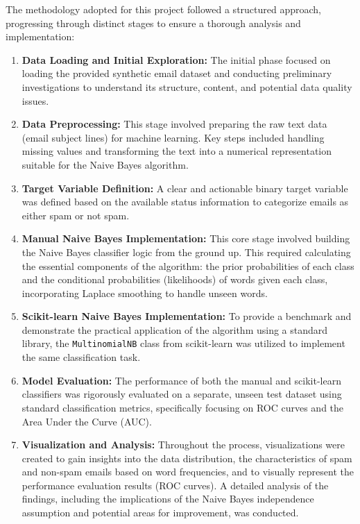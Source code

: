 \documentclass[12pt,letterpaper]{article}
\begin{document}
The methodology adopted for this project followed a structured approach, progressing through distinct stages to ensure a thorough analysis and implementation:

\begin{enumerate}
    \item \textbf{Data Loading and Initial Exploration:} The initial phase focused on loading the provided synthetic email dataset and conducting preliminary investigations to understand its structure, content, and potential data quality issues.
    
    \item \textbf{Data Preprocessing:} This stage involved preparing the raw text data (email subject lines) for machine learning. Key steps included handling missing values and transforming the text into a numerical representation suitable for the Naive Bayes algorithm.
    
    \item \textbf{Target Variable Definition:} A clear and actionable binary target variable was defined based on the available status information to categorize emails as either spam or not spam.
    
    \item \textbf{Manual Naive Bayes Implementation:} This core stage involved building the Naive Bayes classifier logic from the ground up. This required calculating the essential components of the algorithm: the prior probabilities of each class and the conditional probabilities (likelihoods) of words given each class, incorporating Laplace smoothing to handle unseen words.
    
    \item \textbf{Scikit-learn Naive Bayes Implementation:} To provide a benchmark and demonstrate the practical application of the algorithm using a standard library, the \texttt{MultinomialNB} class from scikit-learn was utilized to implement the same classification task.
    
    \item \textbf{Model Evaluation:} The performance of both the manual and scikit-learn classifiers was rigorously evaluated on a separate, unseen test dataset using standard classification metrics, specifically focusing on ROC curves and the Area Under the Curve (AUC).
    
    \item \textbf{Visualization and Analysis:} Throughout the process, visualizations were created to gain insights into the data distribution, the characteristics of spam and non-spam emails based on word frequencies, and to visually represent the performance evaluation results (ROC curves). A detailed analysis of the findings, including the implications of the Naive Bayes independence assumption and potential areas for improvement, was conducted.
\end{enumerate}
\end{document}
